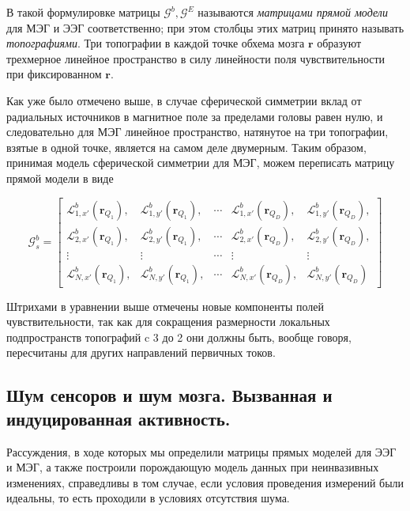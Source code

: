 В такой формулировке матрицы $\mathcal{G}^b, \mathcal{G}^E$ называются \emph{матрицами прямой модели} для МЭГ и ЭЭГ соответственно;
при этом столбцы этих матриц принято называть \emph{топографиями}. Три топографии в каждой точке обхема мозга $\mathbf{r}$
образуют трехмерное линейное пространство в силу линейности поля чувствительности при фиксированном $\mathbf{r}$.

Как уже было отмечено выше, в случае сферической симметрии вклад от радиальных источников в магнитное поле за пределами головы
равен нулю, и следовательно для МЭГ линейное пространство, натянутое на три топографии, взятые в одной точке, является
на самом деле двумерным. Таким образом, принимая модель сферической симметрии для МЭГ, можем переписать матрицу прямой модели в виде

\begin{equation}
    \mathcal{G}^b_{s} =
    \begin{bmatrix}
        \mathcal{L}_{1,x'}^b(\mathbf{r}_{Q_1}), & \mathcal{L}_{1,y'}^b(\mathbf{r}_{Q_1}), &
        \cdots &
        \mathcal{L}_{1,x'}^b(\mathbf{r}_{Q_D}), & \mathcal{L}_{1,y'}^b(\mathbf{r}_{Q_D}), \\
        \mathcal{L}_{2,x'}^b(\mathbf{r}_{Q_1}), & \mathcal{L}_{2,y'}^b(\mathbf{r}_{Q_1}), &
        \cdots &
        \mathcal{L}_{2,x'}^b(\mathbf{r}_{Q_D}), & \mathcal{L}_{2,y'}^b(\mathbf{r}_{Q_D}), \\
        \vdots                                    & \vdots                                    &
        \cdots &
        \vdots                                    & \vdots                                    \\
        \mathcal{L}_{N,x'}^b(\mathbf{r}_{Q_1}), & \mathcal{L}_{N,y'}^b(\mathbf{r}_{Q_1}), &
        \cdots &
        \mathcal{L}_{N,x'}^b(\mathbf{r}_{Q_D}), & \mathcal{L}_{N,y'}^b(\mathbf{r}_{Q_D})
    \end{bmatrix}
\end{equation}

Штрихами в уравнении выше отмечены новые компоненты полей чувствительности, так как для сокращения размерности
локальных подпространств топографий c 3 до 2 они должны быть, вообще говоря,
пересчитаны для других направлений первичных токов.

\subsection{Шум сенсоров и шум мозга. Вызванная и индуцированная активность.}
Рассуждения, в ходе которых мы определили матрицы прямых моделей для ЭЭГ и МЭГ, а также
построили порождающую модель данных при неинвазивных изменениях, справедливы в том случае, если
условия проведения измерений были идеальны, то есть проходили в условиях отсутствия шума.

